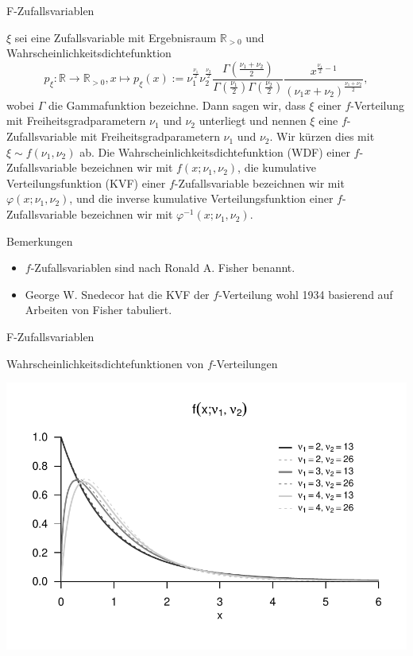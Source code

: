 \documentclass[
  8pt,
  ignorenonframetext,
]{beamer}
\providecommand{\tightlist}{%
  \setlength{\itemsep}{0pt}\setlength{\parskip}{0pt}}
\begin{document}
\begin{frame}{F-Zufallsvariablen}
\protect\hypertarget{f-zufallsvariablen}{}
\footnotesize
\begin{definition}[$f$-Zufallsvariable]
\justifying
$\xi$ sei eine Zufallsvariable mit Ergebnisraum $\mathbb{R}_{>0}$ und Wahrscheinlichkeitsdichtefunktion
\begin{equation}
p_\xi : \mathbb{R} \to \mathbb{R}_{>0}, x \mapsto p_\xi(x)
:= \nu_1^{\frac{\nu_1}{2}}\nu_2^{\frac{\nu_2}{2}}
   \frac{\Gamma\left(\frac{\nu_1+\nu_2}{2}\right)}{\Gamma\left(\frac{\nu_1}{2}\right)\Gamma\left(\frac{\nu_2}{2}\right)}
   \frac{x^{\frac{\nu_1}{2}-1}}{\left(\nu_1 x  + \nu_2 \right)^{\frac{\nu_1+\nu_2}{2}}},
\end{equation}
wobei $\Gamma$ die Gammafunktion bezeichne. Dann sagen wir, dass $\xi$ einer
$f$-Verteilung mit Freiheitsgradparametern $\nu_1$ und $\nu_2$ unterliegt und nennen $\xi$ eine
$f$-Zufallsvariable mit Freiheitsgradparametern $\nu_1$ und $\nu_2$. Wir kürzen dies
mit $\xi \sim f(\nu_1,\nu_2)$ ab. Die Wahrscheinlichkeitsdichtefunktion (WDF) einer
$f$-Zufallsvariable bezeichnen wir mit $f(x;\nu_1,\nu_2)$, die kumulative Verteilungsfunktion (KVF)
einer $f$-Zufallsvariable bezeichnen wir mit $\varphi(x;\nu_1,\nu_2)$, und die inverse
kumulative Verteilungsfunktion einer $f$-Zufallsvariable bezeichnen wir mit $\varphi^{-1}(x;\nu_1,\nu_2)$.
\end{definition}

Bemerkungen

\begin{itemize}
\tightlist
\item
  \(f\)-Zufallsvariablen sind nach Ronald A. Fisher benannt.
\item
  George W. Snedecor hat die KVF der \(f\)-Verteilung wohl 1934
  basierend auf Arbeiten von Fisher tabuliert.
\end{itemize}
\end{frame}

\begin{frame}{F-Zufallsvariablen}
\protect\hypertarget{f-zufallsvariablen-1}{}
\vfill

\small

Wahrscheinlichkeitsdichtefunktionen von \(f\)-Verteilungen \vspace{1mm}

\begin{center}\includegraphics[width=0.8\linewidth]{8_Abbildungen/alm_8_f_wdf} \end{center}
\end{frame}
\end{document}
